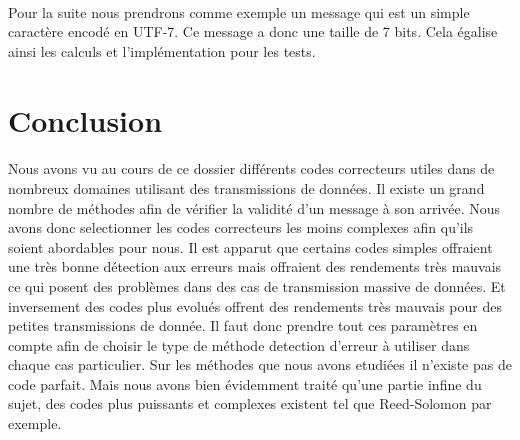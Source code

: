 \documentclass[a4paper,11pt]{report}
\begin{document}
        \paragraph{}
Pour la suite nous prendrons comme exemple un message qui est un simple caractère encodé en UTF-7.
Ce message a donc une taille de 7 bits.
Cela égalise ainsi les calculs et l'implémentation pour les tests.
    \clearpage

    
    \clearpage

    
    \clearpage

    
    \clearpage

    
    \clearpage

    \section{Conclusion}
        \paragraph{}
Nous avons vu au cours de ce dossier différents codes correcteurs utiles dans de nombreux domaines utilisant des transmissions de données.
Il existe un grand nombre de méthodes afin de vérifier la validité d'un message à son arrivée.
Nous avons donc selectionner les codes correcteurs les moins complexes afin qu'ils soient abordables pour nous.
Il est apparut que certains codes simples offraient une très bonne détection aux erreurs mais offraient des rendements très mauvais ce qui posent des problèmes dans des cas de transmission massive de données.
Et inversement des codes plus evolués offrent des rendements très mauvais pour des petites transmissions de donnée.
Il faut donc prendre tout ces paramètres en compte afin de choisir le type de méthode detection d'erreur à utiliser dans chaque cas particulier.
Sur les méthodes que nous avons etudiées il n'existe pas de code parfait.
Mais nous avons bien évidemment traité qu'une partie infine du sujet,
des codes plus puissants et complexes existent tel que Reed-Solomon par exemple.
    \clearpage
\end{document}
